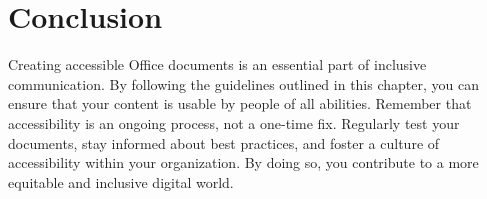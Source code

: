 \section{Conclusion}\label{ch15:sec:conclusion}
Creating accessible Office documents is an essential part of inclusive communication. By following the guidelines outlined in this chapter, you can ensure that your content is usable by people of all abilities. Remember that accessibility is an ongoing process, not a one-time fix. Regularly test your documents, stay informed about best practices, and foster a culture of accessibility within your organization. By doing so, you contribute to a more equitable and inclusive digital world.
